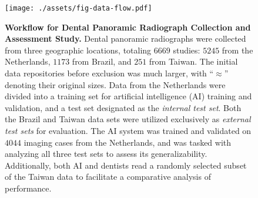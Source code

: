 \begin{figure}[!t]
    \centering
    \texttt{[image: ./assets/fig-data-flow.pdf]}
    \caption{
        \textbf{Workflow for Dental Panoramic Radiograph Collection and Assessment Study.}
        Dental panoramic radiographs were collected from three geographic locations, totaling $\num{6669}$ studies: $\num{5245}$ from the Netherlands, $\num{1173}$ from Brazil, and $\num{251}$ from Taiwan.
        The initial data repositories before exclusion was much larger, with ``$\approx$'' denoting their original sizes.
        Data from the Netherlands were divided into a training set for artificial intelligence (AI) training and validation, and a test set designated as the \emph{internal test set}.
        Both the Brazil and Taiwan data sets were utilized exclusively as \emph{external test sets} for evaluation.
        The AI system was trained and validated on $\num{4044}$ imaging cases from the Netherlands, and was tasked with analyzing all three test sets to assess its generalizability.
        Additionally, both AI and dentists read a randomly selected subset of the Taiwan data to facilitate a comparative analysis of performance.
    }
    \label{fig:data-flow}
\end{figure}